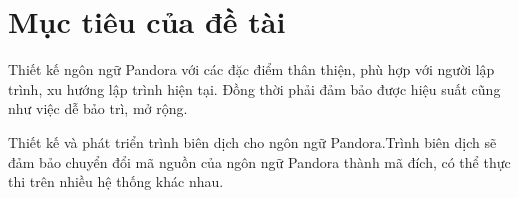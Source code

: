 \section{Mục tiêu của đề tài}
Thiết kế ngôn ngữ Pandora với các đặc điểm thân thiện, phù hợp với người lập trình, xu hướng lập trình hiện tại. Đồng thời phải đảm bảo được hiệu suất cũng như việc dễ bảo trì, mở rộng.

Thiết kế và phát triển trình biên dịch cho ngôn ngữ Pandora.Trình biên dịch sẽ đảm bảo chuyển đổi mã nguồn của ngôn ngữ Pandora thành mã đích, có thể thực thi trên nhiều hệ thống khác nhau.
